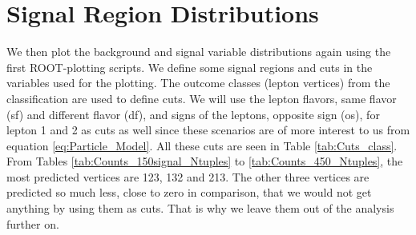 \documentclass[a4paper, american, 12pt]{report}
\begin{document}
	\section{Signal Region Distributions}
	\label{sect:Result-SRDist}
	We then plot the background and signal variable distributions again using the first ROOT-plotting scripts. We define some signal regions and cuts in the variables used for the plotting. The outcome classes (lepton vertices) from the classification are used to define cuts. We will use the lepton flavors, same flavor (\acrshort{sf}) and different flavor (\acrshort{df}), and signs of the leptons, opposite sign (\acrshort{os}), for lepton 1 and 2 as cuts as well since these scenarios are of more interest to us from equation \ref{eq:Particle_Model}. All these cuts are seen in Table \ref{tab:Cuts_class}. From Tables \ref{tab:Counts_150signal_Ntuples} to \ref{tab:Counts_450_Ntuples}, the most predicted vertices are 123, 132 and 213. The other three vertices are predicted so much less, close to zero in comparison, that we would not get anything by using them as cuts. That is why we leave them out of the analysis further on.
	
\end{document}

